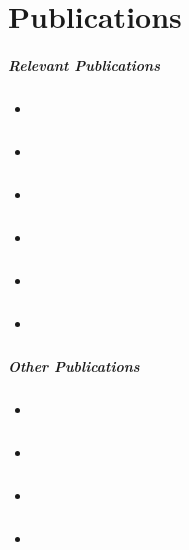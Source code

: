 \chapter{Publications} 

\paragraph{Relevant Publications}

\begin{itemize}
  \item \cite{KieferM14b} 
  \item \cite{KieferM14a} 
  \item \cite{DongK15a} 
  \item \cite{KieferM15a} 
  \item \cite{KieferM15b} 
  \item \cite{KieferM15c} 
\end{itemize}

\paragraph{Other Publications}

\begin{itemize}
  \item \cite{FGKMP2013} 
  \item \cite{BHK2013} 
  \item \cite{opake} 
  \item \cite{ManulisSKD15} 
\end{itemize}
